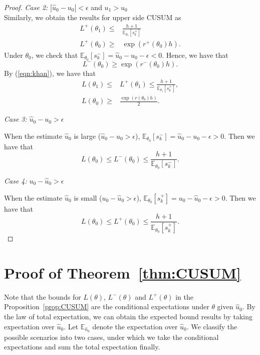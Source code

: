 \documentclass[letterpaper]{article} %
\begin{document}
\begin{proof}
\emph{Case 2:} $|\hat{u}_0-u_0|<\epsilon$ and $u_1>u_0$\\
Similarly, we obtain the results for upper side CUSUM as
\begin{align}
L^+(\theta_1)\leq&\frac{h+1}{\mathbb{E}_{\theta_1}[s^+_k]}\\
L^+(\theta_0)\geq&\exp{(r^+(\theta_0)h)}.
\end{align}
Under $\theta_0$, we check that $\mathbb{E}_{\theta_0}[s^-_k]=\hat{u}_0-u_0-\epsilon<0$. Hence, we have that
\begin{equation}
L^-(\theta_0)\geq\exp{(r^-(\theta_0)h)}.
\end{equation}
By (\ref{eqn:khan}), we have that
\begin{align}
L(\theta_1)\leq& L^+(\theta_1)\leq\frac{h+1}{\mathbb{E}_{\theta_1}[s^+_k]},\\
L(\theta_0)\geq&\frac{\exp{(r(\theta_0)h)}}{2}.
\end{align}


\emph{Case 3:} $\hat{u}_0-u_0>\epsilon$

When the estimate $\hat{u}_0$ is large ($\hat{u}_0-u_0>\epsilon$), $\mathbb{E}_{\theta_0}[s^-_k]=\hat{u}_0-u_0-\epsilon>0$. Then we have that 
\begin{equation}
L(\theta_0)\leq L^-(\theta_0)\leq \frac{h+1}{\mathbb{E}_{\theta_0}[s_k^-]}.
\end{equation}

\emph{Case 4:} $u_0-\hat{u}_0>\epsilon$ 

When the estimate $\hat{u}_0$ is small ($u_0-\hat{u}_0>\epsilon$), $\mathbb{E}_{\theta_0}[s^+_k]=u_0-\hat{u}_0-\epsilon>0$. Then we have that 
\begin{equation}
L(\theta_0)\leq L^+(\theta_0)\leq \frac{h+1}{\mathbb{E}_{\theta_0}[s_k^+]}.
\end{equation}
\end{proof}

\section{Proof of Theorem~\ref{thm:CUSUM}}
Note that the bounds for $L(\theta)$, $L^-(\theta)$ and $L^+(\theta)$ in the Proposition~\ref{prop:CUSUM} are the conditional expectations under $\theta$ given $\hat{u}_0$. By the law of total expectation, we can obtain the expected bound results by taking expectation over $\hat{u}_0$. Let $\mathbb{E}_{\hat{u}_0}$ denote the expectation over $\hat{u}_0$. We classify the possible scenarios into two cases, under which we take the conditional expectations and sum the total expectation finally.
\end{document}
